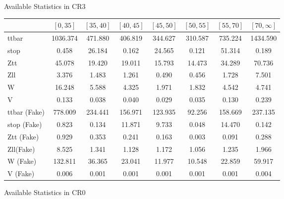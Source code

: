 \documentclass[aspectratio=46, 10pt, t]{beamer} %
\begin{document}
\begin{frame}{Available Statistics in CR3}
  \begin{table}
    \begin{tabular}{lccccccc}
      & $[0,35]$ & $[35,40]$ & $[40,45]$ & $[45,50]$  &  $[50,55]$ &  $[55,70]$ &  $[70, \infty]$ \\ \hline
      ttbar          & 1036.374  & 471.880   & 406.819   & 344.627   & 310.587   & 735.224   & 1434.590   \\
      stop           & 0.458     & 26.184    & 0.162     & 24.565    & 0.121     & 51.314    & 0.189      \\
      Ztt            & 45.078    & 19.420    & 19.011    & 15.793    & 14.473    & 34.289    & 70.736     \\
      Zll            & 3.376     & 1.483     & 1.261     & 0.490     & 0.456     & 1.728     & 7.501      \\
      W              & 16.248    & 5.588     & 4.325     & 1.971     & 1.832     & 4.542     & 4.741      \\
      V              & 0.133     & 0.038     & 0.040     & 0.029     & 0.035     & 0.130     & 0.239      \\
      ttbar (Fake)   & 778.009   & 234.441   & 156.971   & 123.935   & 92.256    & 158.669   & 237.135    \\
      stop (Fake)    & 0.823     & 0.134     & 11.871    & 9.733     & 0.048     & 14.470    & 0.142      \\
      Ztt (Fake)     & 0.929     & 0.353     & 0.241     & 0.163     & 0.003     & 0.091     & 0.288      \\
      Zll(Fake)      & 8.525     & 1.341     & 1.128     & 1.172     & 1.056     & 1.235     & 1.966      \\
      W (Fake)       & 132.811   & 36.365    & 23.041    & 11.977    & 10.548    & 22.859    & 59.917     \\
      V (Fake)       & 0.006     & 0.001     & 0.001     & 0.001     & 0.001     & 0.001     & 0.004      \\
    \end{tabular}
  \end{table}
\end{frame}

\begin{frame}{Available Statistics in CR0}
\end{frame}
\end{document}
